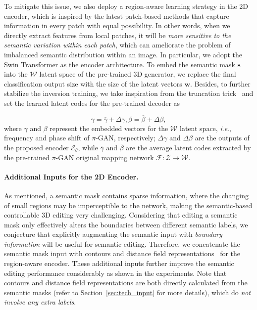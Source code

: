 \documentclass[runningheads]{llncs}
\newcommand{\ie}{\textit{i}.\textit{e}.}
\begin{document}
To mitigate this issue, we also deploy a region-aware learning strategy in the 2D encoder, which is inspired by the latest patch-based methods \cite{dosovitskiy2020image,zheng2021tfill} that capture information in every patch with equal possibility. In other words, when we directly extract features from local patches, it will be \emph{more sensitive to the semantic variation within each patch}, which can ameliorate the problem of imbalanced semantic distribution within an image. In particular, we adopt the Swin Transformer \cite{liu2021swin} as the encoder architecture. To embed the semantic mask $\mathbf{s}$ into the $\mathcal{W}$ latent space of the pre-trained 3D generator, we replace the final classification output size with the size of the latent vectors $\mathbf{w}$. Besides, 
to further stabilize the inversion training, we take inspiration from the truncation trick~\cite{karras2019style,richardson2021encoding} and set the learned latent codes for the pre-trained decoder as


\begin{equation}
    \gamma = \overline{\gamma} + \Delta \gamma, \beta = \overline{\beta} + \Delta \beta,
\end{equation}
where $\gamma$ and $\beta$ represent the embedded vectors for the $\mathcal{W}$ latent space, \ie, frequency and phase shift of $\pi$-GAN, respectively; $\Delta \gamma$ and $\Delta \beta$ are the outputs of the proposed encoder $\mathcal{E}_\theta$, while $\overline{\gamma}$ and $\overline{\beta}$ are the average latent codes extracted by the pre-trained $\pi$-GAN original mapping network $\mathcal{F}:\mathcal{Z}\to\mathcal{W}$.

\paragraph{\textbf{Additional Inputs for the 2D Encoder.}} As mentioned, a semantic mask contains sparse information, where the changing of small regions may be imperceptible to the network, making the semantic-based controllable 3D editing very challenging. Considering that editing a semantic mask only effectively alters the boundaries between different semantic labels, we conjecture that explicitly augmenting the semantic input with \emph{boundary information} will be useful for semantic editing. Therefore, we concatenate the semantic mask input with contours and distance field representations~\cite{chen2018sketchygan} for the region-aware encoder. These additional inputs further improve the semantic editing performance considerably as shown in the experiments. Note that contours and distance field representations are both directly calculated from the semantic masks (refer to Section~\ref{sec:tech_input} for more details), which do \emph{not involve any extra labels}.
\end{document}
